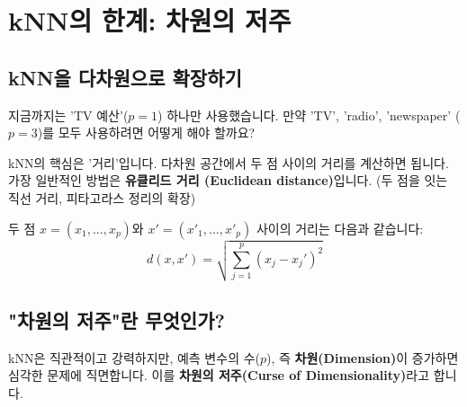 \documentclass[11pt,a4paper]{book}
\theoremstyle{definition}
\begin{document}
\section{kNN의 한계: 차원의 저주}

\subsection{kNN을 다차원으로 확장하기}

지금까지는 'TV 예산'($p=1$) 하나만 사용했습니다.
만약 'TV', 'radio', 'newspaper' ($p=3$)를 모두 사용하려면 어떻게 해야 할까요?

kNN의 핵심은 '거리'입니다. 다차원 공간에서 두 점 사이의 거리를 계산하면 됩니다.
가장 일반적인 방법은 \textbf{유클리드 거리 (Euclidean distance)}입니다.
(두 점을 잇는 직선 거리, 피타고라스 정리의 확장)

두 점 $x = (x_1, ..., x_p)$와 $x' = (x'_1, ..., x'_p)$ 사이의 거리는 다음과 같습니다:
$$ d(x, x') = \sqrt{\sum_{j=1}^{p}(x_{j} - x_{j}')^{2}} $$

\subsection{"차원의 저주"란 무엇인가?}

kNN은 직관적이고 강력하지만, 예측 변수의 수($p$), 즉 \textbf{차원(Dimension)}이 증가하면 심각한 문제에 직면합니다. 이를 \textbf{차원의 저주(Curse of Dimensionality)}라고 합니다.
\end{document}
